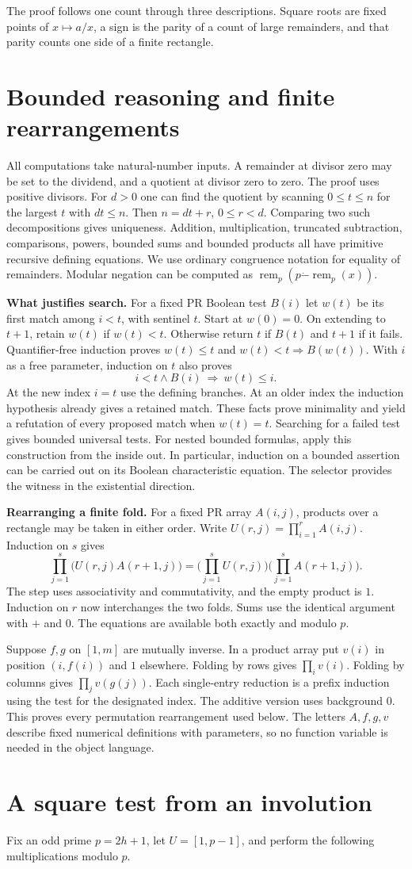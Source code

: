\documentclass[12pt,letterpaper]{article}
\newcommand{\sect}[1]{\section{\texorpdfstring{\color{accent}#1}{#1}}}
\newcommand{\lab}[1]{\textbf{#1.}\enspace}
\newcommand{\remn}{\operatorname{rem}}
\newcommand{\iv}[1]{[1,#1]}
\begin{document}
The proof follows one count through three descriptions. Square roots are fixed points of $x\mapsto a/x$, a sign is the parity of a count of large remainders, and that parity counts one side of a finite rectangle.
\clearpage
\sect{Bounded reasoning and finite rearrangements}\label{sec:bounded}
All computations take natural-number inputs. A remainder at divisor zero may be set to the dividend, and a quotient at divisor zero to zero. The proof uses positive divisors. For $d>0$ one can find the quotient by scanning $0\le t\le n$ for the largest $t$ with $dt\le n$. Then $n=dt+r$, $0\le r<d$. Comparing two such decompositions gives uniqueness. Addition, multiplication, truncated subtraction, comparisons, powers, bounded sums and bounded products all have primitive recursive defining equations. We use ordinary congruence notation for equality of remainders. Modular negation can be computed as $\remn_p(p\mathbin{\dot-}\remn_p(x))$.

\lab{What justifies search} For a fixed PR Boolean test $B(i)$ let $w(t)$ be its first match among $i<t$, with sentinel $t$. Start at $w(0)=0$. On extending to $t+1$, retain $w(t)$ if $w(t)<t$. Otherwise return $t$ if $B(t)$ and $t+1$ if it fails. Quantifier-free induction proves $w(t)\le t$ and $w(t)<t\Rightarrow B(w(t))$. With $i$ as a free parameter, induction on $t$ also proves
\[
 i<t\land B(i)\ \Longrightarrow\ w(t)\le i.
\]
At the new index $i=t$ use the defining branches. At an older index the induction hypothesis already gives a retained match. These facts prove minimality and yield a refutation of every proposed match when $w(t)=t$. Searching for a failed test gives bounded universal tests. For nested bounded formulas, apply this construction from the inside out. In particular, induction on a bounded assertion can be carried out on its Boolean characteristic equation. The selector provides the witness in the existential direction.

\lab{Rearranging a finite fold} For a fixed PR array $A(i,j)$, products over a rectangle may be taken in either order. Write $U(r,j)=\prod_{i=1}^r A(i,j)$. Induction on $s$ gives
\[
 \prod_{j=1}^{s}\big(U(r,j)A(r+1,j)\big)
 =\Big(\prod_{j=1}^{s}U(r,j)\Big)\Big(\prod_{j=1}^{s}A(r+1,j)\Big).
\]
The step uses associativity and commutativity, and the empty product is $1$. Induction on $r$ now interchanges the two folds. Sums use the identical argument with $+$ and $0$. The equations are available both exactly and modulo $p$.

Suppose $f,g$ on $\iv m$ are mutually inverse. In a product array put $v(i)$ in position $(i,f(i))$ and $1$ elsewhere. Folding by rows gives $\prod_i v(i)$. Folding by columns gives $\prod_j v(g(j))$. Each single-entry reduction is a prefix induction using the test for the designated index. The additive version uses background $0$. This proves every permutation rearrangement used below. The letters $A,f,g,v$ describe fixed numerical definitions with parameters, so no function variable is needed in the object language.
\clearpage
\sect{A square test from an involution}\label{sec:euler}
Fix an odd prime $p=2h+1$, let $U=\iv{p-1}$, and perform the following multiplications modulo $p$.
\end{document}
